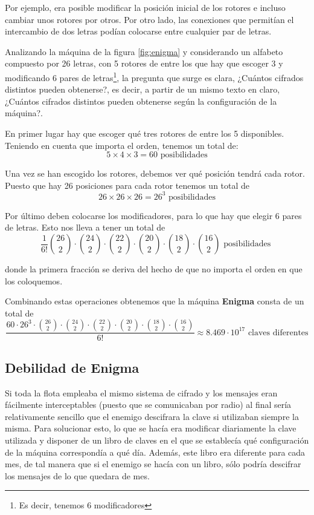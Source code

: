\documentclass[nochap]{apuntesURJC}
\begin{document}
Por ejemplo, era posible modificar la posición inicial de los rotores e incluso cambiar unos rotores por otros. Por otro lado, las conexiones que permitían el intercambio de dos letras podían colocarse entre cualquier par de letras.

Analizando la máquina de la figura \ref{fig:enigma} y considerando un alfabeto compuesto por 26 letras, con 5 rotores de entre los que hay que escoger 3 y modificando 6 pares de letras\footnote{Es decir, tenemos 6 modificadores}, la pregunta que surge es clara, ¿Cuántos cifrados distintos pueden obtenerse?, es decir, a partir de un mismo texto en claro, ¿Cuántos cifrados distintos pueden obtenerse según la configuración de la máquina?.

En primer lugar hay que escoger qué tres rotores de entre los 5 disponibles. Teniendo en cuenta que importa el orden, tenemos un total de:
\[5 \times 4 \times 3 = 60 \text{ posibilidades}\]

Una vez se han escogido los rotores, debemos ver qué posición tendrá cada rotor. Puesto que hay 26 posiciones para cada rotor tenemos un total de
\[26\times 26 \times 26 = 26^3 \text{ posibilidades}\]

Por último deben colocarse los modificadores, para lo que hay que elegir 6 pares de letras. Esto nos lleva a tener un total de
\[\frac{1}{6!}{26 \choose 2} \cdot {24\choose 2}\cdot {22\choose 2}\cdot {20\choose 2}\cdot {18\choose 2}\cdot {16\choose 2} \text{ posibilidades }\]

donde la primera fracción se deriva del hecho de que no importa el orden en que los coloquemos.

Combinando estas operaciones obtenemos que la máquina \textbf{Enigma} consta de un total de
\[\frac{60\cdot 26^3 \cdot {26 \choose 2} \cdot {24\choose 2}\cdot {22\choose 2}\cdot {20\choose 2}\cdot {18\choose 2}\cdot {16\choose 2}}{6!}\approx 8.469 \cdot 10^{17}  \text{ claves diferentes}\]

\subsection{Debilidad de Enigma}

Si toda la flota empleaba el mismo sistema de cifrado y los mensajes eran fácilmente interceptables (puesto que se comunicaban por radio) al final sería relativamente sencillo que el enemigo descifrara la clave si utilizaban siempre la misma.
%
Para solucionar esto, lo que se hacía era modificar diariamente la clave utilizada y disponer de un libro de claves en el que se establecía qué configuración de la máquina correspondía a qué día.
%
Además, este libro era diferente para cada mes, de tal manera que si el enemigo se hacía con un libro, sólo podría descifrar los mensajes de lo que quedara de mes.
\end{document}

